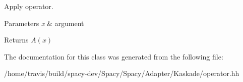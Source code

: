 \-Apply operator. 


\begin{DoxyParams}{\-Parameters}
{\em x} & argument \\
\hline
\end{DoxyParams}
\begin{DoxyReturn}{\-Returns}
$A(x)$ 
\end{DoxyReturn}


\-The documentation for this class was generated from the following file\-:\begin{DoxyCompactItemize}
\item 
/home/travis/build/spacy-\/dev/\-Spacy/\-Spacy/\-Adapter/\-Kaskade/operator.\-hh\end{DoxyCompactItemize}
